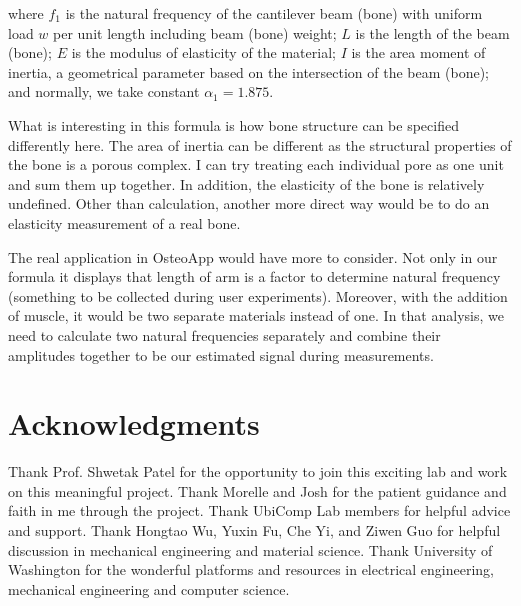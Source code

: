 \documentclass{sigchi}
\begin{document}
where $f_1$ is the natural frequency of the cantilever beam (bone) with uniform load $w$ per unit length including beam (bone) weight; $L$ is the length of the beam (bone); $E$ is the modulus of elasticity of the material; $I$ is the area moment of inertia, a geometrical parameter based on the intersection of the beam (bone); and normally, we take constant $\alpha_1 = 1.875$.

What is interesting in this formula is how bone structure can be specified differently here. The area of inertia can be different as the structural properties of the bone is a porous complex. I can try treating each individual pore as one unit and sum them up together. In addition, the elasticity of the bone is relatively undefined. Other than calculation, another more direct way would be to do an elasticity measurement of a real bone. 
 
The real application in OsteoApp would have more to consider. Not only in our formula it displays that length of arm is a factor to determine natural frequency (something to be collected during user experiments). Moreover, with the addition of muscle, it would be two separate materials instead of one. In that analysis, we need to calculate two natural frequencies separately and combine their amplitudes together to be our estimated signal during measurements. 

\section{Acknowledgments}

Thank Prof. Shwetak Patel for the opportunity to join this exciting lab and work on this meaningful project. Thank Morelle and Josh for the patient guidance and faith in me through the project. Thank UbiComp Lab members for helpful advice and support. Thank Hongtao Wu, Yuxin Fu, Che Yi, and Ziwen Guo for helpful discussion in mechanical engineering and material science. Thank University of Washington for the wonderful platforms and resources in electrical engineering, mechanical engineering and computer science. 

\balance{}




\end{document}
